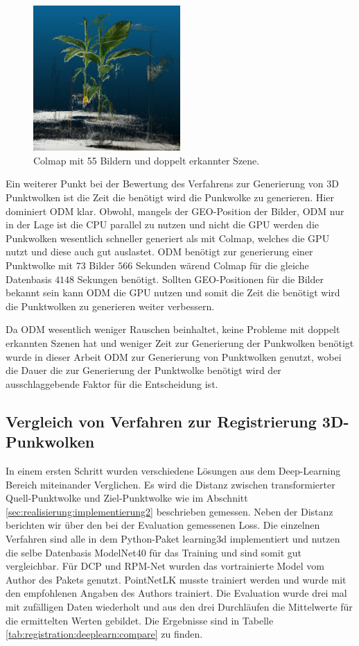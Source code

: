\documentclass[12pt,titlepage, twoside]{article}
\begin{document}
\begin{figure}
    \centering
        \includegraphics[width=0.5\textwidth]{./Images/ColmapDuplicatedScene.png}
        \caption{Colmap mit 55 Bildern und doppelt erkannter Szene.}
        \label{fig:ColmapDuplicatedScene}
\end{figure}

Ein weiterer Punkt bei der Bewertung des Verfahrens zur Generierung von 3D Punktwolken ist die Zeit die benötigt wird die Punkwolke zu generieren.
Hier dominiert ODM klar. Obwohl, mangels der GEO-Position der Bilder, ODM nur in der Lage ist die CPU parallel zu nutzen und nicht die GPU werden die Punkwolken wesentlich schneller generiert als mit Colmap, welches die GPU nutzt und diese auch gut auslastet.
ODM benötigt zur generierung einer Punktwolke mit $73$ Bilder $566$ Sekunden wärend Colmap für die gleiche Datenbasis $4148$ Sekungen benötigt. 
Sollten GEO-Positionen für die Bilder bekannt sein kann ODM die GPU nutzen und somit die Zeit die benötigt wird die Punktwolken zu generieren weiter verbessern.

Da ODM wesentlich weniger Rauschen beinhaltet, keine Probleme mit doppelt erkannten Szenen hat und weniger Zeit zur Generierung der Punkwolken benötigt wurde in dieser Arbeit ODM zur Generierung von Punktwolken genutzt, wobei die Dauer die zur Generierung der Punktwolke benötigt wird der ausschlaggebende Faktor für die Entscheidung ist.

\subsection{Vergleich von Verfahren zur Registrierung 3D-Punkwolken}

In einem ersten Schritt wurden verschiedene Lösungen aus dem Deep-Learning Bereich miteinander Verglichen. 
Es wird die Distanz zwischen transformierter Quell-Punktwolke und Ziel-Punktwolke wie im Abschnitt \ref{sec:realisierung:implementierung2} beschrieben gemessen. Neben der Distanz berichten wir über den bei der Evaluation gemessenen Loss.
Die einzelnen Verfahren sind alle in dem Python-Paket learning3d \cite{learning3d} implementiert und nutzen die selbe Datenbasis ModelNet40 für das Training und sind somit gut vergleichbar. Für DCP und RPM-Net wurden das vortrainierte Model vom Author des Pakets genutzt.
PointNetLK musste trainiert werden und wurde mit den empfohlenen Angaben des Authors trainiert. Die Evaluation wurde drei mal mit zufälligen Daten wiederholt und aus den drei Durchläufen die Mittelwerte für die ermittelten Werten gebildet.
Die Ergebnisse sind in Tabelle \ref{tab:registration:deeplearn:compare} zu finden.
\end{document}
